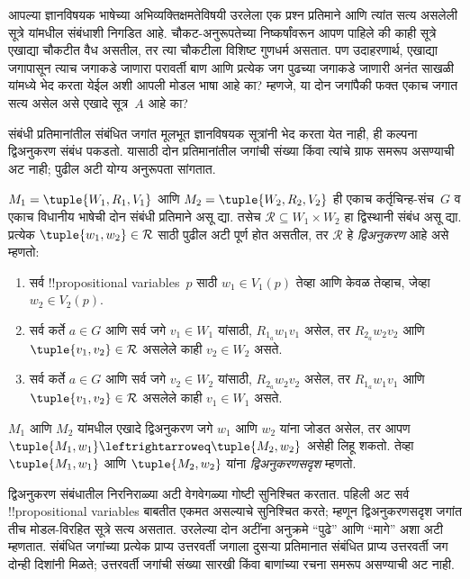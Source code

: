 \documentclass[../../../include/open-logic-section]{subfiles}
\begin{document}


आपल्या ज्ञानविषयक भाषेच्या अभिव्यक्तिक्षमतेविषयी
उरलेला एक प्रश्न प्रतिमाने आणि त्यांत सत्य असलेली
सूत्रे यांमधील संबंधाशी निगडित आहे. चौकट-अनुरूपतेच्या
निष्कर्षांवरून आपण पाहिले की काही सूत्रे एखाद्या
चौकटीत वैध असतील, तर त्या चौकटीला विशिष्ट गुणधर्म
असतात. पण उदाहरणार्थ, एखाद्या जगापासून त्याच
जगाकडे जाणारा परावर्ती बाण आणि प्रत्येक जग पुढच्या
जगाकडे जाणारी अनंत साखळी यांमध्ये भेद करता येईल
अशी आपली मोडल भाषा आहे का? म्हणजे, या दोन
जगांपैकी फक्त एकाच जगात सत्य असेल असे एखादे
सूत्र~$A$ आहे का?

संबंधी प्रतिमानांतील संबंधित जगांत मूलभूत
ज्ञानविषयक सूत्रांनी भेद करता येत नाही, ही कल्पना
द्विअनुकरण संबंध पकडतो. यासाठी दोन प्रतिमानांतील
जगांची संख्या किंवा त्यांचे ग्राफ समरूप असण्याची
अट नाही; पुढील अटी योग्य अनुरूपता सांगतात.

\begin{defn}[द्विअनुकरण]
$M_1 = \tuple{W_1, R_1, V_1}$ आणि $M_2 = \tuple{W_2, R_2, V_2}$
ही एकाच कर्तृचिन्ह-संच~$G$ व एकाच विधानीय
भाषेची दोन संबंधी प्रतिमाने असू द्या. तसेच
$\mathcal{R} \subseteq W_1 \times W_2$ हा द्विस्थानी
संबंध असू द्या. प्रत्येक $\tuple{w_1, w_2} \in
\mathcal{R}$ साठी पुढील अटी पूर्ण होत असतील, तर
$\mathcal{R}$ हे \emph{द्विअनुकरण} आहे असे म्हणतो:

\begin{enumerate}
  \item सर्व !!{propositional variable}s~$p$ साठी
  $w_1 \in V_1(p)$ तेव्हा आणि केवळ तेव्हाच, जेव्हा
  $w_2 \in V_2(p)$.
  \item सर्व कर्ते $a \in G$ आणि सर्व जगे $v_1 \in W_1$
  यांसाठी, $R_{1_a} w_1 v_1$ असेल, तर $R_{2_a} w_2 v_2$
  आणि $\tuple{v_1, v_2} \in \mathcal{R}$ असलेले काही
  $v_2 \in W_2$ असते.
  \item सर्व कर्ते $a \in G$ आणि सर्व जगे $v_2 \in W_2$
  यांसाठी, $R_{2_a} w_2 v_2$ असेल, तर $R_{1_a} w_1 v_1$
  आणि $\tuple{v_1, v_2} \in \mathcal{R}$ असलेले काही
  $v_1 \in W_1$ असते.
\end{enumerate}

$M_1$ आणि $M_2$ यांमधील एखादे द्विअनुकरण जगे
$w_1$ आणि $w_2$ यांना जोडत असेल, तर आपण
$\tuple{M_1, w_1} \leftrightarroweq
\tuple{M_2, w_2}$ असेही लिहू शकतो. तेव्हा
$\tuple{M_1, w_1}$ आणि $\tuple{M_2, w_2}$ यांना
\emph{द्विअनुकरणसदृश} म्हणतो.
\end{defn}

द्विअनुकरण संबंधातील निरनिराळ्या अटी वेगवेगळ्या
गोष्टी सुनिश्चित करतात. पहिली अट सर्व !!{propositional variable}s
बाबतीत एकमत असल्याचे सुनिश्चित करते;
म्हणून द्विअनुकरणसदृश जगांत तीच मोडल-विरहित सूत्रे
सत्य असतात. उरलेल्या दोन अटींना अनुक्रमे ``पुढे''
आणि ``मागे'' अशा अटी म्हणतात. संबंधित जगांच्या प्रत्येक
प्राप्य उत्तरवर्ती जगाला दुसऱ्या प्रतिमानात संबंधित
प्राप्य उत्तरवर्ती जग दोन्ही दिशांनी मिळते; उत्तरवर्ती
जगांची संख्या सारखी किंवा बाणांच्या रचना समरूप असण्याची अट नाही.
\end{document}
